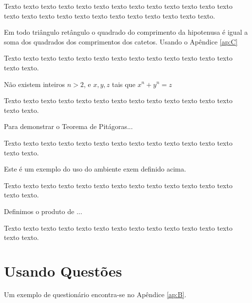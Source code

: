  Texto texto texto texto texto texto texto texto texto texto texto texto texto texto texto texto texto texto texto texto texto texto texto texto texto.

\begin{teo}[Pitágoras]
	Em todo triângulo retângulo o quadrado do comprimento da
	hipotenusa é igual a soma dos quadrados dos comprimentos dos catetos. Usando o Apêndice \ref{ap:C}
\end{teo}


Texto texto texto texto texto texto texto texto texto texto texto texto texto texto texto.

\begin{teo}[Fermat]
	Não existem inteiros $n > 2$, e $x, y, z$ tais que $x^n + y^n = z$
\end{teo}

Texto texto texto texto texto texto texto texto texto texto texto texto texto texto texto.

\begin{prop}
	Para demonstrar o Teorema de Pitágoras...
\end{prop}

Texto texto texto texto texto texto texto texto texto texto texto texto texto texto texto.

\begin{exem}
	Este é um exemplo do uso do ambiente exem definido acima.
\end{exem}

Texto texto texto texto texto texto texto texto texto texto texto texto texto texto texto.


\begin{xdefinicao}
	Definimos o produto de ...
\end{xdefinicao}

Texto texto texto texto texto texto texto texto texto texto texto texto texto texto texto.

\section{Usando Questões} 

Um exemplo de questionário encontra-se no Apêndice \ref{ap:B}.


\fi